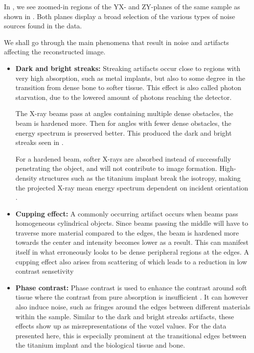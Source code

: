 In , we see zoomed-in regions of the YX- and ZY-planes of the
same sample as shown in . Both planes display a broad
selection of the various types of noise sources found in the data.

We shall go through the main phenomena that result in noise and artifacts
affecting the reconstructed image.

\begin{itemize}
  \item \textbf{Dark and bright streaks:} Streaking artifacts occur close to
	regions with very high absorption, such as metal implants, but also
	to some degree in the transition from dense bone to softer
	tissue.
	This effect is also called photon starvation, due to the
	lowered amount of photons reaching the detector.

	The X-ray beams pass at angles containing
	multiple dense obstacles, the beam is hardened more. Then for
	angles with fewer dense obstacles, the energy spectrum is
	preserved better. This produced the dark and bright streaks
	seen in .

	For a hardened beam, softer X-rays are absorbed instead of
	successfully penetrating the object, and will not contribute to
	image formation.  High-density structures such as the titanium
	implant break the isotropy, making the projected X-ray mean
	energy spectrum dependent on incident orientation
	\citep{srnoise}.


  \item \textbf{Cupping effect:} A commonly occurring artifact occurs when beams pass
    homogeneous cylindrical objects. Since beams passing the middle will have to
	traverse more material compared to the edges, the beam is hardened more
	towards the center and intensity becomes lower as a result. This can
	manifest itself in what erroneously looks to be dense peripheral
	regions at the edges. A cupping effect also arises from scattering of
	which leads to a reduction in low contrast sensetivity

  \item \textbf{Phase contrast:} Phase contrast is used to enhance the contrast
	around soft tissue where the contrast from pure absorption is
	insufficient \citep{phasecontrast}. It can however also induce
	noise, such as fringes around the edges between different
	materials within the sample\citep{srnoise}. Similar to the dark
	and bright streaks artifacts, these effects show up as
	misrepresentations of the voxel values. For the data presented
	here, this is especially prominent at the transitional edges
	between the titanium implant and the biological tissue and
	bone.


\end{itemize}
